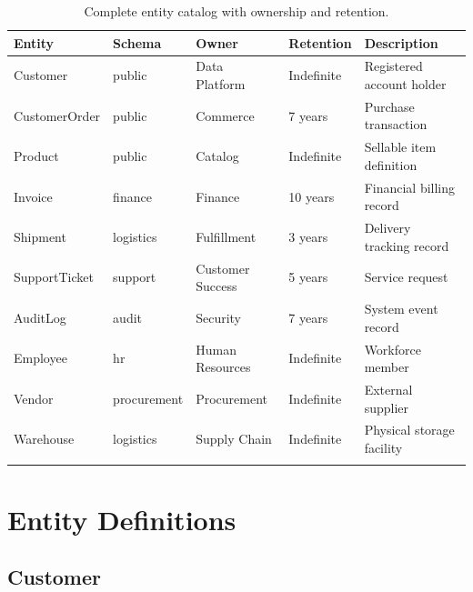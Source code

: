 \documentclass[
    language=english,
    doctype=data-dictionary,
    institution=none,
]{../../omnilatex}
\begin{document}
\begin{longtable}{llllp{3cm}}
    \toprule
    \textbf{Entity} & \textbf{Schema} & \textbf{Owner} & \textbf{Retention} & \textbf{Description} \\
    \midrule
    \endhead
    Customer & public & Data Platform & Indefinite & Registered account holder \\
    CustomerOrder & public & Commerce & 7 years & Purchase transaction \\
    Product & public & Catalog & Indefinite & Sellable item definition \\
    Invoice & finance & Finance & 10 years & Financial billing record \\
    Shipment & logistics & Fulfillment & 3 years & Delivery tracking record \\
    SupportTicket & support & Customer Success & 5 years & Service request \\
    AuditLog & audit & Security & 7 years & System event record \\
    Employee & hr & Human Resources & Indefinite & Workforce member \\
    Vendor & procurement & Procurement & Indefinite & External supplier \\
    Warehouse & logistics & Supply Chain & Indefinite & Physical storage facility \\
    \bottomrule
    \caption{Complete entity catalog with ownership and retention.}
\end{longtable}

\section{Entity Definitions}

\subsection{Customer}
\end{document}
